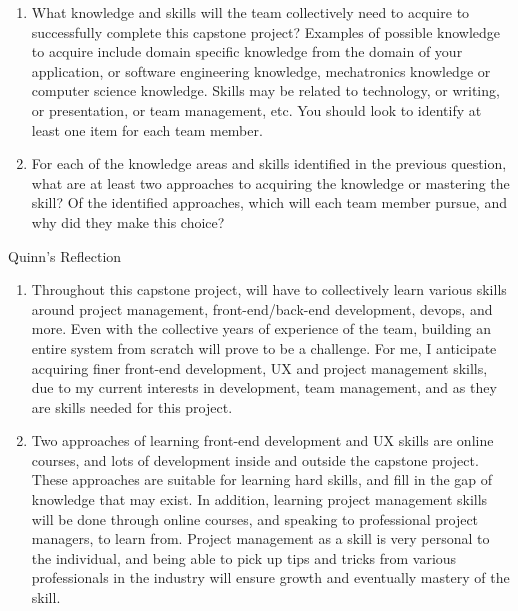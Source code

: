 \documentclass[12pt]{article}
\begin{document}
\begin{enumerate}
  \item What knowledge and skills will the team collectively need to acquire to
  successfully complete this capstone project?  Examples of possible knowledge
  to acquire include domain specific knowledge from the domain of your
  application, or software engineering knowledge, mechatronics knowledge or
  computer science knowledge.  Skills may be related to technology, or writing,
  or presentation, or team management, etc.  You should look to identify at
  least one item for each team member.
  \item For each of the knowledge areas and skills identified in the previous
  question, what are at least two approaches to acquiring the knowledge or
  mastering the skill?  Of the identified approaches, which will each team
  member pursue, and why did they make this choice?
\end{enumerate}

Quinn's Reflection
\begin{enumerate}
    \item Throughout this capstone project, will have to collectively learn various skills around project management, front-end/back-end development, devops, and more. Even with the collective years of experience of the team, building an entire system from scratch will prove to be a challenge. For me, I anticipate acquiring finer front-end development, UX and project management skills, due to my current interests in development, team management, and as they are skills needed for this project.

    \item Two approaches of learning front-end development and UX skills are online courses, and lots of development inside and outside the capstone project. These approaches are suitable for learning hard skills, and fill in the gap of knowledge that may exist. In addition, learning project management skills will be done through online courses, and speaking to professional project managers, to learn from. Project management as a skill is very personal to the individual, and being able to pick up tips and tricks from various professionals in the industry will ensure growth and eventually mastery of the skill.
\end{enumerate}
\end{document}

